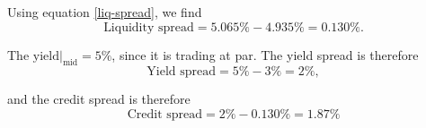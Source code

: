 \documentclass[../notes_compiled.tex]{subfiles}
\begin{document}
\begin{itemize}
{\item[] Using equation \ref{liq-spread}, we find
\begin{equation*}
\text{Liquidity spread} = 5.065\% - 4.935\% = 0.130\%.
\end{equation*}

The $\text{yield}|_{\text{mid}}=5\%$, since it is trading at par. The yield spread is therefore
\begin{equation*}
\text{Yield spread} = 5\% - 3\% = 2\%,
\end{equation*}

and the credit spread is therefore
\begin{equation*}
\text{Credit spread} = 2\% - 0.130\% = 1.87\%
\end{equation*}
}

\end{itemize}
\end{document}
